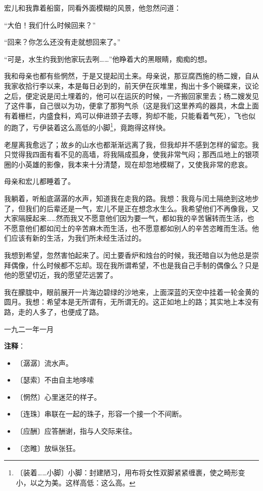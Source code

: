 \documentclass[12pt,UTF-8,openany]{ctexbook}
\begin{document}
\begin{large}
    宏儿和我靠着船窗，同看外面模糊的风景，他忽然问道：
    
    “大伯！我们什么时候回来？”
    
    “回来？你怎么还没有走就想回来了。”
    
    “可是，水生约我到他家玩去咧……”他睁着大的黑眼睛，痴痴的想。
    
    我和母亲也都有些惘然，于是又提起闰土来。母亲说，那豆腐西施的杨二嫂，自从我家收拾行李以来，本是每日必到的，前天伊在灰堆里，掏出十多个碗碟来，议论之后，便定说是闰土埋着的，他可以在运灰的时候，一齐搬回家里去；杨二嫂发见了这件事，自己很以为功，便拿了那狗气杀（这是我们这里养鸡的器具，木盘上面有着栅栏，内盛食料，鸡可以伸进颈子去啄，狗却不能，只能看着气死），飞也似的跑了，亏伊装着这么高低的小脚\footnote{〔装着……小脚〕小脚：封建陋习，用布将女性双脚紧紧缠裹，使之畸形变小，以之为美。这样高低：这么高。}，竟跑得这样快。
    
    老屋离我愈远了；故乡的山水也都渐渐远离了我，但我却并不感到怎样的留恋。我只觉得我四面有看不见的高墙，将我隔成孤身，使我非常气闷；那西瓜地上的银项圈的小英雄的影像，我本来十分清楚，现在却忽地模糊了，又使我非常的悲哀。
    
    母亲和宏儿都睡着了。
    
    我躺着，听船底潺潺的水声，知道我在走我的路。我想：我竟与闰土隔绝到这地步了，但我们的后辈还是一气，宏儿不是正在想念水生么。我希望他们不再像我，又大家隔膜起来……然而我又不愿意他们因为要一气，都如我的辛苦辗转而生活，也不愿意他们都如闰土的辛苦麻木而生活，也不愿意都如别人的辛苦恣睢而生活。他们应该有新的生活，为我们所未经生活过的。
    
    我想到希望，忽然害怕起来了。闰土要香炉和烛台的时候，我还暗自以为他总是崇拜偶像，什么时候都不忘却。现在我所谓希望，不也是我自己手制的偶像么？只是他的愿望切近，我的愿望茫远罢了。
    
    我在朦胧中，眼前展开一片海边碧绿的沙地来，上面深蓝的天空中挂着一轮金黄的圆月。我想：希望本是无所谓有，无所谓无的。这正如地上的路；其实地上本没有路，走的人多了，也便成了路。
    
    \hfill 一九二一年一月
    
\end{large}


\newpage

\textbf{注释}：

\vspace{-1em}

\begin{itemize}
    \setlength\itemsep{-0.2em}
    \item 〔潺潺〕流水声。
    \item 〔瑟索〕不由自主地哆嗦
    \item 〔惘然〕心里迷茫的样子。
    \item 〔连珠〕串联在一起的珠子，形容一个接一个不间断。
    \item 〔应酬〕应答酬谢，指与人交际来往。
    \item 〔恣睢〕放纵张狂。
\end{itemize}
\end{document}
